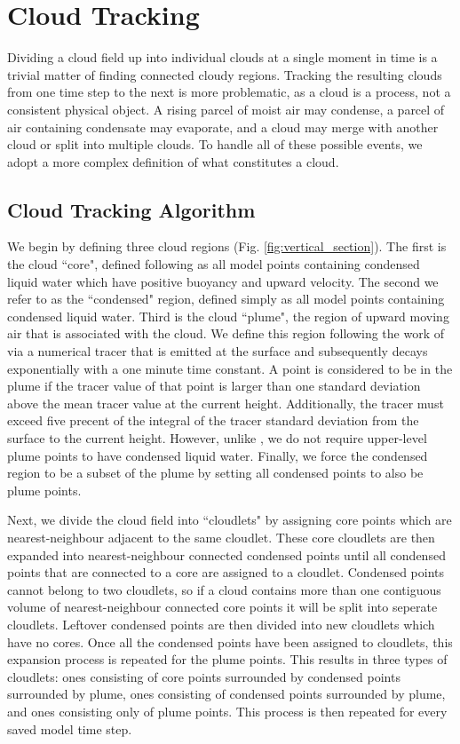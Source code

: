 \documentclass[acp]{copernicus}
\begin{document}
\section{Cloud Tracking}

Dividing a cloud field up into individual clouds at a single moment in time is 
a trivial matter of finding connected cloudy regions.  Tracking the resulting 
clouds from one time step to the next is more problematic, as a cloud is a 
process, not a consistent physical object.  A rising parcel of moist air 
may condense, a parcel of air containing condensate may evaporate, and a cloud 
may merge with another cloud or split into multiple clouds.  To handle all of 
these possible events, we adopt a more complex definition of what constitutes 
a cloud.

\subsection{Cloud Tracking Algorithm}

We begin by defining three cloud regions (Fig. \ref{fig:vertical_section}).  
The first is the cloud ``core", defined following \cite{Siebesma1995} as all 
model points containing condensed liquid water which have positive buoyancy and 
upward velocity.  The second we refer to as the ``condensed" region, defined 
simply as all model points containing condensed liquid water.  Third is the 
cloud ``plume", the region of upward moving air that is associated with the 
cloud.  We define this region following the work of \cite{Couvreaux2010} via a 
numerical tracer that is emitted at the surface and subsequently decays 
exponentially with a one minute time constant.  A point is considered to be in 
the plume if the tracer value of that point is larger than one standard 
deviation above the mean tracer value at the current height.  Additionally, 
the tracer must exceed five precent of the integral of the tracer standard 
deviation from the surface to the current height.  However, unlike 
\citeauthor{Couvreaux2010}, we do not require upper-level plume points to have 
condensed liquid water.  Finally, we force the condensed region to be a subset 
of the plume by setting all condensed points to also be plume points.

Next, we divide the cloud field into ``cloudlets" by assigning core points 
which are nearest-neighbour adjacent to the same cloudlet.  These core 
cloudlets are then expanded into nearest-neighbour connected condensed points 
until all condensed points that are connected to a core are assigned to a 
cloudlet.  Condensed points cannot belong to two cloudlets, so if a cloud 
contains more than one contiguous volume of nearest-neighbour connected core 
points it will be split into seperate cloudlets.  Leftover condensed points are 
then divided into new cloudlets which have no cores.  Once all the condensed 
points have been assigned to cloudlets, this expansion process is repeated for 
the plume points.  This results in three types of cloudlets: ones consisting of 
core points surrounded by condensed points surrounded by plume, ones consisting 
of condensed points surrounded by plume, and ones consisting only of plume 
points.  This process is then repeated for every saved model time step.
\end{document}
